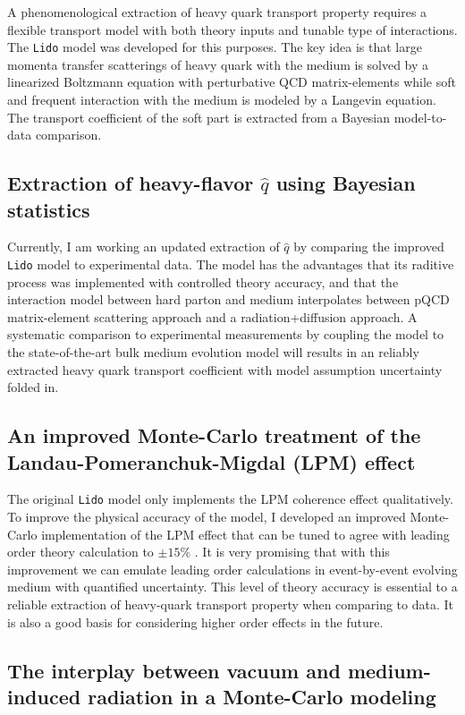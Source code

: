 \documentclass[10pt,a4paper]{article}
\begin{document}
A phenomenological extraction of heavy quark transport property requires a flexible transport model with both theory inputs and tunable type of interactions. 
The {\tt Lido} model \cite{Ke:2018tsh, Ke:2018jem} was developed for this purposes. The key idea is that large momenta transfer scatterings of heavy quark with the medium is solved by a linearized Boltzmann equation with perturbative QCD matrix-elements while soft and frequent interaction with the medium is modeled by a Langevin equation. The transport coefficient of the soft part is extracted from a Bayesian model-to-data comparison.

\subsection{Extraction of heavy-flavor $\hat{q}$ using Bayesian statistics}

Currently, I am working an updated extraction of $\hat{q}$ by comparing the improved {\tt Lido} model to experimental data. 
The model has the advantages that its raditive process was implemented with controlled theory accuracy, and that the interaction model between hard parton and medium interpolates between pQCD matrix-element scattering approach and a radiation+diffusion approach. 
A systematic comparison to experimental measurements by coupling the model to the state-of-the-art bulk medium evolution model will results in an reliably extracted heavy quark transport coefficient with model assumption uncertainty folded in.

\subsection{An improved Monte-Carlo treatment of the Landau-Pomeranchuk-Migdal (LPM) effect}

The original {\tt Lido} model only implements the LPM coherence effect qualitatively. To improve the physical accuracy of the model, I developed an improved Monte-Carlo implementation of the LPM effect that can be tuned to agree with leading order theory calculation to $\pm 15\%$ \cite{Ke:2018jem}. It is very promising that with this improvement we can emulate leading order calculations in event-by-event evolving medium with quantified uncertainty.
This level of theory accuracy is essential to a reliable extraction of heavy-quark transport property when comparing to data. It is also a good basis for considering higher order effects in the future.


\subsection{The interplay between vacuum and medium-induced radiation in a Monte-Carlo modeling}
\end{document}
